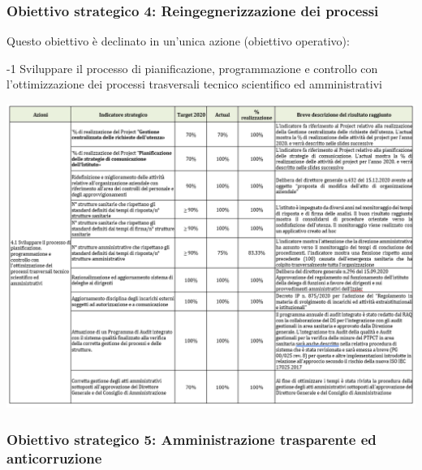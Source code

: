 \documentclass[
  12pt,
]{article}
\begin{document}
\newpage

\hypertarget{obiettivo-strategico-4-reingegnerizzazione-dei-processi}{%
\subsubsection*{\texorpdfstring{Obiettivo strategico 4:
\textbf{Reingegnerizzazione dei
processi}}{Obiettivo strategico 4: Reingegnerizzazione dei processi}}\label{obiettivo-strategico-4-reingegnerizzazione-dei-processi}}

Questo obiettivo è declinato in un'unica azione (obiettivo operativo):

-1 Sviluppare il processo di pianificazione, programmazione e controllo
con l'ottimizzazione dei processi trasversali tecnico scientifico ed
amministrativi

\begin{center}\includegraphics[width=1.1\linewidth]{figure/ob4} \end{center}

\newpage

\hypertarget{obiettivo-strategico-5-amministrazione-trasparente-ed-anticorruzione}{%
\subsubsection*{\texorpdfstring{Obiettivo strategico 5:
\textbf{Amministrazione trasparente ed
anticorruzione}}{Obiettivo strategico 5: Amministrazione trasparente ed anticorruzione}}\label{obiettivo-strategico-5-amministrazione-trasparente-ed-anticorruzione}}
\end{document}
